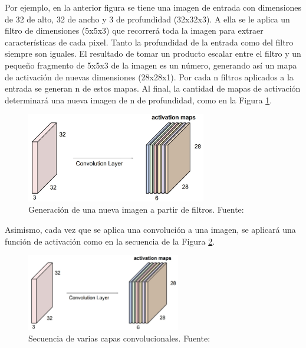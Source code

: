 \begin{itemize}
\begin{itemize}
\begin{itemize}
			Por ejemplo, en la anterior figura se tiene una imagen de entrada con dimensiones de 32 de alto, 32 de ancho y 3 de profundidad (32x32x3). A ella se le aplica un filtro de dimensiones (5x5x3) que recorrerá toda la imagen para extraer características de cada pixel. Tanto la profundidad de la entrada como del filtro siempre son iguales. El resultado de tomar un producto escalar entre el filtro y un pequeño fragmento de 5x5x3 de la imagen es un número, generando así un mapa de activación de nuevas dimensiones (28x28x1). Por cada n filtros aplicados a la entrada se generan n de estos mapas. Al final, la cantidad de mapas de activación determinará una nueva imagen de n de profundidad, como en la Figura \ref{2:fig26}.
			\begin{figure}[h]
				\begin{center}
					\includegraphics[width=0.7\textwidth]{2/figures/filtros_cnn.jpg}
					\caption{Generación de una nueva imagen a partir de filtros. Fuente: \cite{tec_li2019cnn}}
					\label{2:fig26}
				\end{center}
			\end{figure}
			
			Asimismo, cada vez que se aplica una convolución a una imagen, se aplicará una función de activación como en la secuencia de la Figura \ref{2:fig27}.
			\begin{figure}[h]
				\begin{center}
					\includegraphics[width=0.60\textwidth]{2/figures/filtros_cnn.jpg}
					\caption{Secuencia de varias capas convolucionales. Fuente: \cite{tec_li2019cnn}}
					\label{2:fig27}
				\end{center}
			\end{figure}
			

\end{itemize}
\end{itemize}
\end{itemize}
